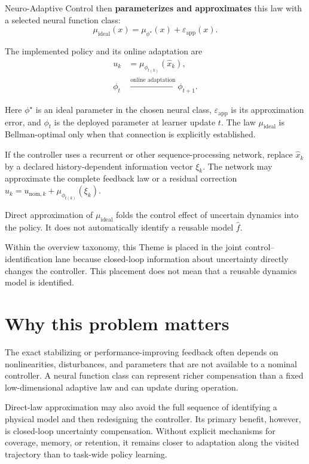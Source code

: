 \documentclass[a4paper]{article}
\begin{document}
Neuro-Adaptive Control then \textbf{parameterizes and approximates} this law with a selected neural function class:
\begin{equation}
  \mu_{\mathrm{ideal}}(x)
  =
  \mu_{\phi^\star}(x)
  +
  \varepsilon_{\mathrm{app}}(x).
\end{equation}

The implemented policy and its online adaptation are
\begin{equation}
  \begin{aligned}
    u_k
    &=
    \mu_{\phi_{t(k)}}(\widehat x_k),\\
    \phi_t
    &\xrightarrow{\text{online adaptation}}
    \phi_{t+1}.
  \end{aligned}
\end{equation}

Here $\phi^\star$ is an ideal parameter in the chosen neural class, $\varepsilon_{\mathrm{app}}$ is its approximation error, and $\phi_t$ is the deployed parameter at learner update $t$. The law $\mu_{\mathrm{ideal}}$ is Bellman-optimal only when that connection is explicitly established.

If the controller uses a recurrent or other sequence-processing network, replace $\widehat x_k$ by a declared history-dependent information vector $\xi_k$. The network may approximate the complete feedback law or a residual correction $u_k=u_{\mathrm{nom},k}+\mu_{\phi_{t(k)}}(\xi_k)$.

Direct approximation of $\mu_{\mathrm{ideal}}$ folds the control effect of
uncertain dynamics into the policy. It does not automatically identify a
reusable model $\widehat f$.

Within the overview taxonomy, this Theme is placed in the joint
control–identification lane because closed-loop information about uncertainty
directly changes the controller. This placement does not mean that a reusable
dynamics model is identified.

\section{Why this problem matters}

The exact stabilizing or performance-improving feedback often depends on nonlinearities, disturbances, and parameters that are not available to a nominal controller. A neural function class can represent richer compensation than a fixed low-dimensional adaptive law and can update during operation.

Direct-law approximation may also avoid the full sequence of identifying a physical model and then redesigning the controller. Its primary benefit, however, is closed-loop uncertainty compensation. Without explicit mechanisms for coverage, memory, or retention, it remains closer to adaptation along the visited trajectory than to task-wide policy learning.
\end{document}
